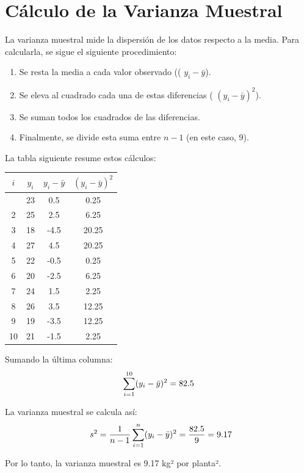 \documentclass[
  spanish,
  letterpaper,
]{book}
\begin{document}
\section{Cálculo de la Varianza
Muestral}\label{cuxe1lculo-de-la-varianza-muestral}

La varianza muestral mide la dispersión de los datos respecto a la
media. Para calcularla, se sigue el siguiente procedimiento:

\begin{enumerate}
\def\labelenumi{\arabic{enumi}.}
\item
  Se resta la media a cada valor observado (( \(y_i - \bar{y}\)).
\item
  Se eleva al cuadrado cada una de estas diferencias (
  \((y_i - \bar{y})^2\)).
\item
  Se suman todos los cuadrados de las diferencias.
\item
  Finalmente, se divide esta suma entre \(n-1\) (en este caso, 9).
\end{enumerate}

La tabla siguiente resume estos cálculos:

\begin{longtable}[]{@{}cccc@{}}
\toprule\noalign{}
\(i\) & \(y_i\) & \(y_i - \bar{y}\) & \((y_i - \bar{y})^2\) \\
\midrule\noalign{}
\endhead
\bottomrule\noalign{}
\endlastfoot
1 & 23 & 0.5 & 0.25 \\
2 & 25 & 2.5 & 6.25 \\
3 & 18 & -4.5 & 20.25 \\
4 & 27 & 4.5 & 20.25 \\
5 & 22 & -0.5 & 0.25 \\
6 & 20 & -2.5 & 6.25 \\
7 & 24 & 1.5 & 2.25 \\
8 & 26 & 3.5 & 12.25 \\
9 & 19 & -3.5 & 12.25 \\
10 & 21 & -1.5 & 2.25 \\
\end{longtable}

Sumando la última columna: \[
\LARGE\sum_{i=1}^{10} (y_i - \bar{y})^2  = 82.5
\]

La varianza muestral se calcula así: \[
\LARGE\ s^2 = \frac{1}{n-1} \sum_{i=1}^{n} (y_i - \bar{y})^2 = \frac{82.5}{9} = 9.17
\]

Por lo tanto, la varianza muestral es 9.17 kg² por planta².

\end{document}
